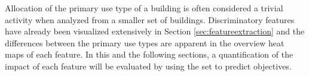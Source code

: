 Allocation of the primary use type of a building is often considered a trivial activity when analyzed from a smaller set of buildings. Discriminatory features have already been visualized extensively in Section \ref{sec:featureextraction} and the differences between the primary use types are apparent in the overview heat maps of each feature. In this and the following sections, a quantification of the impact of each feature will be evaluated by using the set to predict objectives.